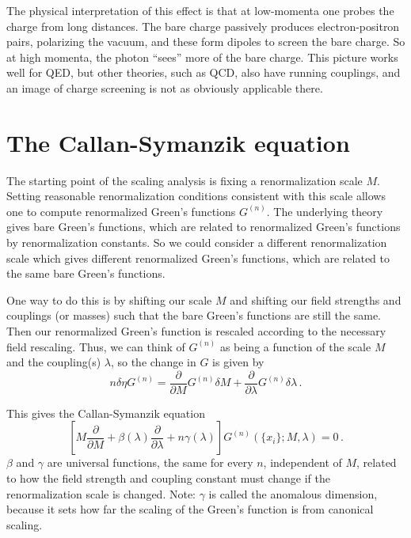 \documentclass[12pt]{memoir}
\begin{document}
The physical interpretation of this effect is that
at low-momenta one probes the charge from long distances.
The bare charge passively produces electron-positron pairs, polarizing the vacuum,
and these form dipoles to screen the bare charge.
So at high momenta, the photon ``sees'' more of the bare charge.
This picture works well for QED, but other theories, such as QCD, also have running couplings,
and an image of charge screening is not as obviously applicable there.


\section{The Callan-Symanzik equation}

The starting point of the scaling analysis is fixing a renormalization scale $M$.
Setting reasonable renormalization conditions consistent with this scale allows one to compute renormalized Green's functions $G^{(n)}$.
The underlying theory gives bare Green's functions, which are related to renormalized Green's functions by renormalization constants.
So we could consider a different renormalization scale which gives different renormalized Green's functions,
which are related to the same bare Green's functions.

One way to do this is by shifting our scale $M$ and shifting our field strengths and couplings (or masses)
such that the bare Green's functions are still the same.
Then our renormalized Green's function is rescaled according to the necessary field rescaling.
Thus, we can think of $G^{(n)}$ as being a function of the scale $M$ and the coupling(s) $\lambda$,
so the change in $G$ is given by
\begin{equation}
  n \delta \eta G^{(n)} = \frac{\partial}{\partial M}G^{(n)} \delta M + \frac{\partial}{\partial \lambda} G^{(n)} \delta \lambda \,.
\end{equation}

This gives the Callan-Symanzik equation
\begin{equation}
  \left[M \frac{\partial}{\partial M} + \beta(\lambda) \frac{\partial}{\partial \lambda} + n \gamma(\lambda)\right]G^{(n)}(\{x_i\}; M, \lambda) = 0\,.
\end{equation}
$\beta$ and $\gamma$ are universal functions, the same for every $n$, independent of $M$,
related to how the field strength and coupling constant must change if the renormalization scale is changed.
Note: $\gamma$ is called the anomalous dimension, because it sets how far the scaling of the Green's function is
from canonical scaling.
\end{document}
